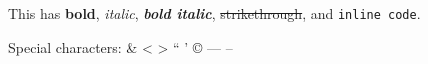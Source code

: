 This has \textbf{bold}, \emph{italic}, \emph{\textbf{bold italic}}, \sout{strikethrough}, and \texttt{inline code}.

Special characters: \& < > “ ’ © — –


